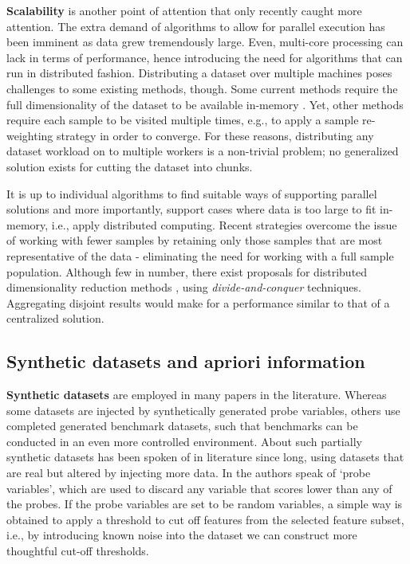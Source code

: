 \documentclass{article}
\begin{document}
\textbf{Scalability} is another point of attention that only recently caught more attention. The extra demand of algorithms to allow for parallel execution has been imminent as data grew tremendously large. Even, multi-core processing can lack in terms of performance, hence introducing the need for algorithms that can run in distributed fashion. Distributing a dataset over multiple machines poses challenges to some existing methods, though. Some current methods require the full dimensionality of the dataset to be available in-memory \citep{tang_feature_2014}. Yet, other methods require each sample to be visited multiple times, e.g., to apply a sample re-weighting strategy in order to converge. For these reasons, distributing any dataset workload on to multiple workers is a non-trivial problem; no generalized solution exists for cutting the dataset into chunks.

It is up to individual algorithms to find suitable ways of supporting parallel solutions and more importantly, support cases where data is too large to fit in-memory, i.e., apply distributed computing. Recent strategies overcome the issue of working with fewer samples by retaining only those samples that are most representative of the data - eliminating the need for working with a full sample population. Although few in number, there exist proposals for distributed dimensionality reduction methods \citep{li_distributed_2020}, using \textit{divide-and-conquer} techniques. Aggregating disjoint results would make for a performance similar to that of a centralized solution.

\subsection{Synthetic datasets and apriori information}
\textbf{Synthetic datasets} are employed in many papers in the literature. Whereas some datasets are injected by synthetically generated probe variables, others use completed generated benchmark datasets, such that benchmarks can be conducted in an even more controlled environment.
About such partially synthetic datasets has been spoken of in literature since long, using datasets that are real but altered by injecting more data. In \citep{guyon_introduction_2003} the authors speak of \lq probe variables', which are used to discard any variable that scores lower than any of the probes. If the probe variables are set to be random variables, a simple way is obtained to apply a threshold to cut off features from the selected feature subset, i.e., by introducing known noise into the dataset we can construct more thoughtful cut-off thresholds.
\end{document}
